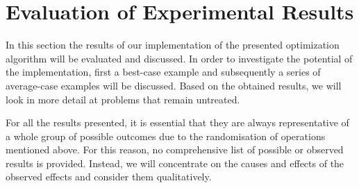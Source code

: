 \documentclass[
	accentcolor=1c,%
	type=intern,
	marginpar=false,
	ruledheaders=section,
	class=report,
	BCOR=5mm,
      parskip=half-,
	fontsize=10pt
	]{tudapub}
\begin{document}
	\section{Evaluation of Experimental Results}
		In this section the results of our implementation of the presented optimization algorithm will be evaluated and discussed.
		In order to investigate the potential of the implementation, first a best-case example and subsequently a series of average-case examples will be discussed.
		Based on the obtained results, we will look in more detail at problems that remain untreated.

		For all the results presented, it is essential that they are always representative of a whole group of possible outcomes due to the randomisation of operations mentioned above.
		For this reason, no comprehensive list of possible or observed results is provided.
		Instead, we will concentrate on the causes and effects of the observed effects and consider them qualitatively.
\end{document}
